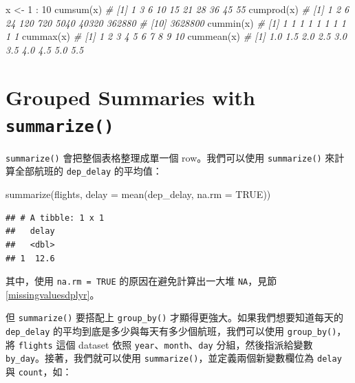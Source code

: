 \documentclass[
]{book}
\newenvironment{Shaded}{\begin{snugshade}}{\end{snugshade}}
\newcommand{\AttributeTok}[1]{\textcolor[rgb]{0.77,0.63,0.00}{#1}}
\newcommand{\CommentTok}[1]{\textcolor[rgb]{0.56,0.35,0.01}{\textit{#1}}}
\newcommand{\ConstantTok}[1]{\textcolor[rgb]{0.00,0.00,0.00}{#1}}
\newcommand{\DecValTok}[1]{\textcolor[rgb]{0.00,0.00,0.81}{#1}}
\newcommand{\FunctionTok}[1]{\textcolor[rgb]{0.00,0.00,0.00}{#1}}
\newcommand{\NormalTok}[1]{#1}
\newcommand{\OtherTok}[1]{\textcolor[rgb]{0.56,0.35,0.01}{#1}}
\newcommand{\SpecialCharTok}[1]{\textcolor[rgb]{0.00,0.00,0.00}{#1}}
\theoremstyle{definition}
\theoremstyle{remark}
\begin{document}
\begin{Shaded}
\begin{Highlighting}[]
\NormalTok{x }\OtherTok{\textless{}{-}} \DecValTok{1} \SpecialCharTok{:} \DecValTok{10}
\FunctionTok{cumsum}\NormalTok{(x)}
\CommentTok{\#  [1]  1  3  6 10 15 21 28 36 45 55}
\FunctionTok{cumprod}\NormalTok{(x)}
\CommentTok{\#  [1]       1       2       6      24     120     720    5040   40320  362880}
\CommentTok{\# [10] 3628800}
\FunctionTok{cummin}\NormalTok{(x)}
\CommentTok{\#  [1] 1 1 1 1 1 1 1 1 1 1}
\FunctionTok{cummax}\NormalTok{(x)}
\CommentTok{\#  [1]  1  2  3  4  5  6  7  8  9 10}
\FunctionTok{cummean}\NormalTok{(x)}
\CommentTok{\#  [1] 1.0 1.5 2.0 2.5 3.0 3.5 4.0 4.5 5.0 5.5}
\end{Highlighting}
\end{Shaded}

\hypertarget{summarize}{%
\section{\texorpdfstring{Grouped Summaries with \texttt{summarize()}}{Grouped Summaries with summarize()}}\label{summarize}}

\texttt{summarize()} 會把整個表格整理成單一個 row。我們可以使用 \texttt{summarize()} 來計算全部航班的 \texttt{dep\_delay} 的平均值：

\begin{Shaded}
\begin{Highlighting}[]
\FunctionTok{summarize}\NormalTok{(flights, }\AttributeTok{delay =} \FunctionTok{mean}\NormalTok{(dep\_delay, }\AttributeTok{na.rm =} \ConstantTok{TRUE}\NormalTok{))}
\end{Highlighting}
\end{Shaded}

\begin{verbatim}
## # A tibble: 1 x 1
##   delay
##   <dbl>
## 1  12.6
\end{verbatim}

其中，使用 \texttt{na.rm\ =\ TRUE} 的原因在避免計算出一大堆 \texttt{NA}，見節 \ref{missingvaluesdplyr}。

但 \texttt{summarize()} 要搭配上 \texttt{group\_by()} 才顯得更強大。如果我們想要知道每天的 \texttt{dep\_delay} 的平均到底是多少與每天有多少個航班，我們可以使用 \texttt{group\_by()}，將 \texttt{flights} 這個 dataset 依照 \texttt{year}、\texttt{month}、\texttt{day} 分組，然後指派給變數 \texttt{by\_day}。接著，我們就可以使用 \texttt{summarize()}，並定義兩個新變數欄位為 \texttt{delay} 與 \texttt{count}，如：
\end{document}
